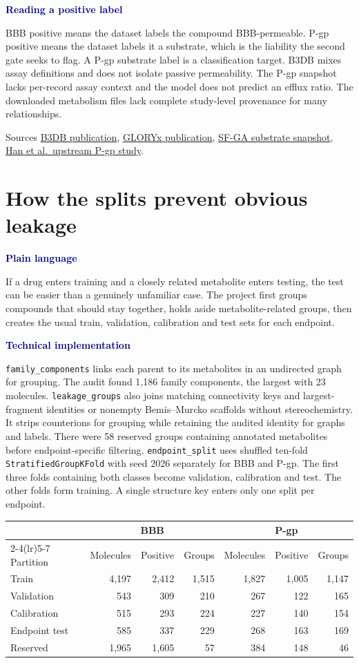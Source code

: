 \documentclass[11pt,a4paper]{article}
\newcommand{\code}[1]{\nolinkurl{#1}}
\newcommand{\lead}[1]{\par\smallskip\textbf{\textcolor{Navy}{#1}}\par\nobreak}
\newcommand{\pagehead}[1]{\clearpage\section{#1}}
\newcommand{\src}[2]{\href{#1}{#2}}
\newcommand{\dense}{\small\renewcommand{\arraystretch}{1.11}\setlength{\tabcolsep}{4pt}}
\begin{document}
\lead{Reading a positive label}
BBB positive means the dataset labels the compound BBB-permeable. P-gp positive means the dataset labels it a substrate, which is the liability the second gate seeks to flag. A P-gp substrate label is a classification target. B3DB mixes assay definitions and does not isolate passive permeability. The P-gp snapshot lacks per-record assay context and the model does not predict an efflux ratio. The downloaded metabolism files lack complete study-level provenance for many relationships.

\smallskip
Sources \src{https://doi.org/10.1038/s41597-021-01069-5}{B3DB publication},
\src{https://doi.org/10.1021/acs.chemrestox.0c00224}{GLORYx publication},
\src{https://doi.org/10.1021/acs.jcim.6c01938}{SF-GA substrate snapshot},
\src{https://doi.org/10.1021/acs.jcim.4c02122}{Han et al.\ upstream P-gp study}.


\pagehead{How the splits prevent obvious leakage}
\lead{Plain language}
If a drug enters training and a closely related metabolite enters testing, the test can be easier than a genuinely unfamiliar case. The project first groups compounds that should stay together, holds aside metabolite-related groups, then creates the usual train, validation, calibration and test sets for each endpoint.

\lead{Technical implementation}
\code{family_components} links each parent to its metabolites in an undirected graph for grouping. The audit found 1,186 family components, the largest with 23 molecules. \code{leakage_groups} also joins matching connectivity keys and largest-fragment identities or nonempty Bemis--Murcko scaffolds without stereochemistry. It strips counterions for grouping while retaining the audited identity for graphs and labels. There were 58 reserved groups containing annotated metabolites before endpoint-specific filtering. \code{endpoint_split} uses shuffled ten-fold \code{StratifiedGroupKFold} with seed 2026 separately for BBB and P-gp. The first three folds containing both classes become validation, calibration and test. The other folds form training. A single structure key enters only one split per endpoint.

{\dense
\begin{center}
\begin{tabular}{lrrrrrr}
\toprule
& \multicolumn{3}{c}{BBB} & \multicolumn{3}{c}{P-gp}\\
\cmidrule(lr){2-4}\cmidrule(lr){5-7}
Partition & Molecules & Positive & Groups & Molecules & Positive & Groups\\
\midrule
Train & 4,197 & 2,412 & 1,515 & 1,827 & 1,005 & 1,147\\
Validation & 543 & 309 & 210 & 267 & 122 & 165\\
Calibration & 515 & 293 & 224 & 227 & 140 & 154\\
Endpoint test & 585 & 337 & 229 & 268 & 163 & 169\\
Reserved & 1,965 & 1,605 & 57 & 384 & 148 & 46\\
\bottomrule
\end{tabular}
\end{center}}
\end{document}
